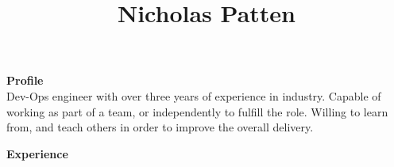 \documentclass[a4paper,12pt,final,sans]{memoir}
\title{\vspace{-2.5cm} \textbf{\textsf{\color{head} Nicholas Patten}}\\}
\date{\vspace{-7.0em}}
\begin{document}
\maketitle %
\thispagestyle{empty} %

\vspace{2mm}
\textbf{\textsf{\color{head} \large{Profile} }} \\[0.3em]
Dev-Ops engineer with over three years of experience in industry. Capable of working as part of a team, or independently to fulfill the role. Willing to learn from, and teach others in order to improve the overall delivery. \\


\vskip-2mm

\textbf{\textsf{\color{head} \large{Experience} }}\\[-1.5em]
\end{document}
